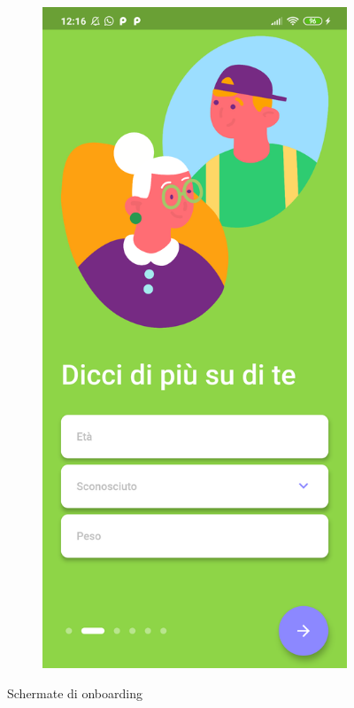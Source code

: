 \begin{figure}[!htb]
\begin{subfigure}{0.35\textwidth}
    \end{subfigure}
    \begin{subfigure}{0.35\textwidth}
        \includegraphics[width=\textwidth]{figures/screenshot/redmi_note_8t/general_info.png}
    \end{subfigure}
    \caption{Schermate di onboarding}
    \label{fig:onboarding}
\end{figure}

